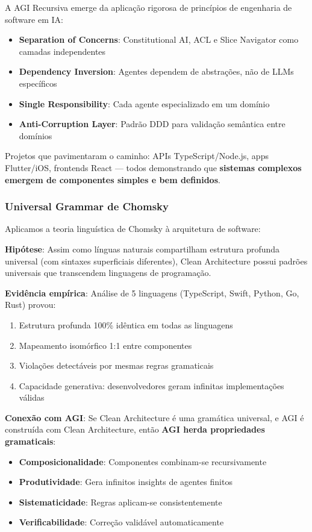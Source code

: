 \documentclass[11pt]{article}
\begin{document}
A AGI Recursiva emerge da aplicação rigorosa de princípios de engenharia de software em IA:

\begin{itemize}
    \item \textbf{Separation of Concerns}: Constitutional AI, ACL e Slice Navigator como camadas independentes
    \item \textbf{Dependency Inversion}: Agentes dependem de abstrações, não de LLMs específicos
    \item \textbf{Single Responsibility}: Cada agente especializado em um domínio
    \item \textbf{Anti-Corruption Layer}: Padrão DDD para validação semântica entre domínios
\end{itemize}

Projetos que pavimentaram o caminho: APIs TypeScript/Node.js, apps Flutter/iOS, frontends React --- todos demonstrando que \textbf{sistemas complexos emergem de componentes simples e bem definidos}.

\subsubsection{Universal Grammar de Chomsky}

Aplicamos a teoria linguística de Chomsky à arquitetura de software:

\textbf{Hipótese}: Assim como línguas naturais compartilham estrutura profunda universal (com sintaxes superficiais diferentes), Clean Architecture possui padrões universais que transcendem linguagens de programação.

\textbf{Evidência empírica}: Análise de 5 linguagens (TypeScript, Swift, Python, Go, Rust) provou:
\begin{enumerate}
    \item Estrutura profunda 100\% idêntica em todas as linguagens
    \item Mapeamento isomórfico 1:1 entre componentes
    \item Violações detectáveis por mesmas regras gramaticais
    \item Capacidade generativa: desenvolvedores geram infinitas implementações válidas
\end{enumerate}

\textbf{Conexão com AGI}: Se Clean Architecture é uma gramática universal, e AGI é construída com Clean Architecture, então \textbf{AGI herda propriedades gramaticais}:

\begin{itemize}
    \item \textbf{Composicionalidade}: Componentes combinam-se recursivamente
    \item \textbf{Produtividade}: Gera infinitos insights de agentes finitos
    \item \textbf{Sistematicidade}: Regras aplicam-se consistentemente
    \item \textbf{Verificabilidade}: Correção validável automaticamente
\end{itemize}
\end{document}

